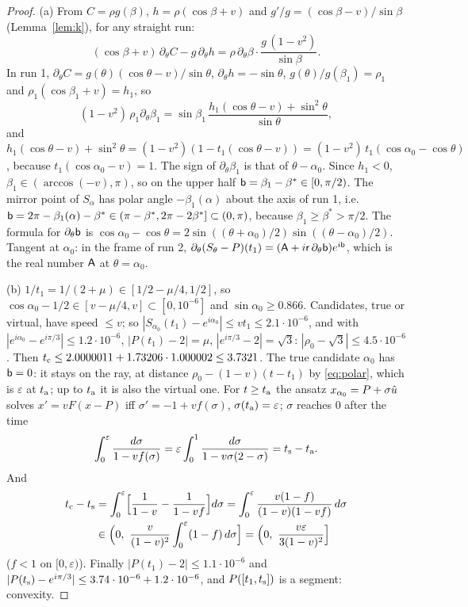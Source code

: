 \begin{proof}
(a) From $C=\rho g(\beta)$, $h=\rho(\cos\beta+v)$ and $g'/g=(\cos\beta-v)/\sin\beta$ (Lemma~\ref{lem:k}), for any straight run:
\[
(\cos\beta+v)\,\partial_\theta C-g\,\partial_\theta h=\rho\,\partial_\theta\beta\cdot\frac{g\,(1-v^2)}{\sin\beta}.
\]
In run 1, $\partial_\theta C=g(\theta)(\cos\theta-v)/\sin\theta$, $\partial_\theta h=-\sin\theta$, $g(\theta)/g(\beta_1)=\rho_1$ and
$\rho_1(\cos\beta_1+v)=h_1$, so
\[
(1-v^2)\,\rho_1\partial_\theta\beta_1=\sin\beta_1\,\frac{h_1(\cos\theta-v)+\sin^2\!\theta}{\sin\theta},
\]
and $h_1(\cos\theta-v)+\sin^2\!\theta=(1-v^2)(1-t_1(\cos\theta-v))=(1-v^2)\,t_1(\cos\alpha_0-\cos\theta)$, because
$t_1(\cos\alpha_0-v)=1$. The sign of $\partial_\theta\beta_1$ is that of $\theta-\alpha_0$. Since $h_1<0$,
$\beta_1\in(\arccos(-v),\pi)$, so on the upper half $\mathsf b=\beta_1-\beta^*\in[0,\pi/2)$. The mirror point of $S_\alpha$ has polar angle
$-\beta_1(\alpha)$ about the axis of run 1, i.e.\ $\mathsf b=2\pi-\beta_1(\alpha)-\beta^*\in(\pi-\beta^*,2\pi-2\beta^*]\subset(0,\pi)$, because
$\beta_1\ge\beta^*>\pi/2$. The formula for $\partial_\theta\mathsf b$ is
$\cos\alpha_0-\cos\theta=2\sin((\theta+\alpha_0)/2)\sin((\theta-\alpha_0)/2)$. Tangent at $\alpha_0$: in the frame of run 2,
$\partial_\theta(S_\theta-P)(t_1)=(\mathsf A+i\mathsf r\,\partial_\theta\mathsf b)e^{i\mathsf b}$, which is the real number $\mathsf A$ at $\theta=\alpha_0$.

(b) $1/t_1=1/(2+\mu)\in[1/2-\mu/4,1/2]$, so $\cos\alpha_0-1/2\in[v-\mu/4,v]\subset[0,10^{-6}]$ and $\sin\alpha_0\ge0.866$. Candidates, true
or virtual, have speed $\le v$; so $|S_{\alpha_0}(t_1)-e^{i\alpha_0}|\le vt_1\le2.1\cdot10^{-6}$, and with
$|e^{i\alpha_0}-e^{i\pi/3}|\le1.2\cdot10^{-6}$, $|P(t_1)-2|=\mu$, $|e^{i\pi/3}-2|=\sqrt3$: $|\rho_0-\sqrt3|\le4.5\cdot10^{-6}$. Then
$t_{\mathrm c}\le2.0000011+1.73206\cdot1.000002\le3.7321$. The true candidate $\alpha_0$ has $\mathsf b=0$: it stays on the ray, at distance
$\rho_0-(1-v)(t-t_1)$ by \eqref{eq:polar}, which is $\varepsilon$ at $t_{\mathrm a}$; up to $t_{\mathrm a}$ it is also the virtual one. For $t\ge t_{\mathrm a}$ the
ansatz $x_{\alpha_0}=P+\sigma\hat u$ solves $x'=vF(x-P)$ iff $\sigma'=-1+vf(\sigma)$, $\sigma(t_{\mathrm a})=\varepsilon$; $\sigma$ reaches $0$ after the
time
\[
\int_0^\varepsilon\frac{d\sigma}{1-vf(\sigma)}=\varepsilon\int_0^1\frac{d\sigma}{1-v\sigma(2-\sigma)}=t_{\mathrm s}-t_{\mathrm a} .
\]
And
\begin{align*}
\TDtc-\Bts&=\int_0^\varepsilon\Bigl[\frac1{1-v}-\frac1{1-vf}\Bigr]d\sigma=\int_0^\varepsilon\frac{v(1-f)}{(1-v)(1-vf)}\,d\sigma\\
&\in\Bigl(0,\ \frac v{(1-v)^2}\int_0^\varepsilon(1-f)\,d\sigma\Bigr]=\Bigl(0,\ \frac{v\varepsilon}{3(1-v)^2}\Bigr]
\end{align*}
($f<1$ on $[0,\varepsilon)$). Finally $|P(t_1)-2|\le1.1\cdot10^{-6}$ and $|P(t_{\mathrm s})-e^{i\pi/3}|\le3.74\cdot10^{-6}+1.2\cdot10^{-6}$, and
$P([t_1,t_{\mathrm s}])$ is a segment: convexity.


\end{proof}
